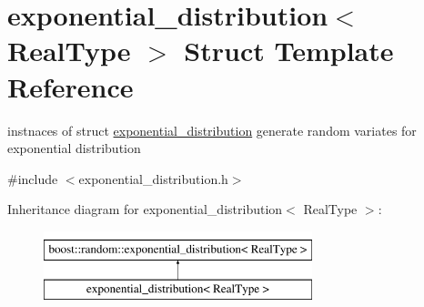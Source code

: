 \hypertarget{structexponential__distribution}{}\section{exponential\+\_\+distribution$<$ Real\+Type $>$ Struct Template Reference}
\label{structexponential__distribution}


instnaces of struct \mbox{\hyperlink{structexponential__distribution}{exponential\+\_\+distribution}} generate random variates for exponential distribution  




{\ttfamily \#include $<$exponential\+\_\+distribution.\+h$>$}

Inheritance diagram for exponential\+\_\+distribution$<$ Real\+Type $>$\+:\begin{figure}[H]
\begin{center}
\leavevmode
\includegraphics[height=2.000000cm]{structexponential__distribution}
\end{center}
\end{figure}
